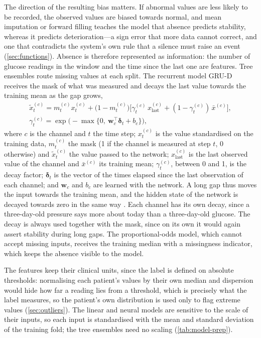 \documentclass[11pt,a4paper,oneside]{report}
\begin{document}
The direction of the resulting bias matters. If abnormal values are less likely to be recorded, the observed values are biased towards normal, and mean imputation or forward filling teaches the model that absence predicts stability, whereas it predicts deterioration---a sign error that more data cannot correct, and one that contradicts the system's own rule that a silence must raise an event (\cref{sec:functions}). Absence is therefore represented as information: the number of glucose readings in the window and the time since the last one are features. Tree ensembles route missing values at each split. The recurrent model GRU-D \parencite{che2018} receives the mask of what was measured and decays the last value towards the training mean as the gap grows,
\begin{equation}
\begin{gathered}
  \tilde{x}^{(c)}_t = m^{(c)}_t x^{(c)}_t + \bigl(1 - m^{(c)}_t\bigr)\bigl[\gamma^{(c)}_t\, x^{(c)}_{\text{last}} + (1-\gamma^{(c)}_t)\,\bar{x}^{(c)}\bigr], \\
  \gamma^{(c)}_t = \exp\bigl(-\max\{0,\ \mathbf{w}_c^{\top}\boldsymbol{\delta}_t + b_c\}\bigr),
\end{gathered}
\end{equation}
where $c$ is the channel and $t$ the time step; $x^{(c)}_t$ is the value standardised on the training data, $m^{(c)}_t$ the mask (1 if the channel is measured at step $t$, 0 otherwise) and $\tilde{x}^{(c)}_t$ the value passed to the network; $x^{(c)}_{\text{last}}$ is the last observed value of the channel and $\bar{x}^{(c)}$ its training mean; $\gamma^{(c)}_t$, between 0 and 1, is the decay factor; $\boldsymbol{\delta}_t$ is the vector of the times elapsed since the last observation of each channel; and $\mathbf{w}_c$ and $b_c$ are learned with the network. A long gap thus moves the input towards the training mean, and the hidden state of the network is decayed towards zero in the same way \parencite{che2018}. Each channel has its own decay, since a three-day-old pressure says more about today than a three-day-old glucose. The decay is always used together with the mask, since on its own it would again assert stability during long gaps. The proportional-odds model, which cannot accept missing inputs, receives the training median with a missingness indicator, which keeps the absence visible to the model.

The features keep their clinical units, since the label is defined on absolute thresholds: normalising each patient's values by their own median and dispersion would hide how far a reading lies from a threshold, which is precisely what the label measures, so the patient's own distribution is used only to flag extreme values (\cref{sec:outliers}). The linear and neural models are sensitive to the scale of their inputs, so each input is standardised with the mean and standard deviation of the training fold; the tree ensembles need no scaling (\cref{tab:model-prep}).
\end{document}
